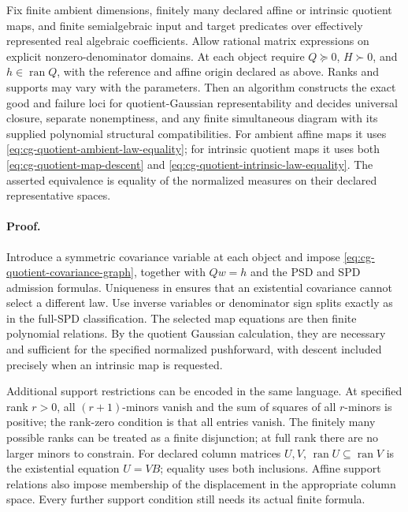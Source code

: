 Fix finite ambient dimensions, finitely many declared
affine or intrinsic quotient maps, and finite
semialgebraic input and target predicates over effectively
represented real algebraic coefficients. Allow rational
matrix expressions on explicit nonzero-denominator
domains. At each object require \(Q\succeq0\),
\(H\succ0\), and \(h\in\operatorname{ran}Q\), with the
reference and affine origin declared as above.
Ranks and supports may vary with the parameters.
Then an algorithm constructs the exact good and
failure loci for quotient-Gaussian representability
and decides universal closure, separate nonemptiness,
and any finite simultaneous diagram with its supplied
polynomial structural compatibilities.
For ambient affine maps it uses
\eqref{eq:cg-quotient-ambient-law-equality}; for intrinsic
quotient maps it uses both
\eqref{eq:cg-quotient-map-descent} and
\eqref{eq:cg-quotient-intrinsic-law-equality}.
The asserted equivalence is equality of the normalized
measures on their declared representative spaces.

\paragraph{Proof.}
Introduce a symmetric covariance variable at each object and
impose \eqref{eq:cg-quotient-covariance-graph}, together
with \(Qw=h\) and the PSD and SPD admission formulas.
Uniqueness in
 ensures
that an existential covariance cannot select a
different law. Use inverse variables or denominator
sign splits exactly as in the full-SPD classification.
The selected map equations are then finite polynomial
relations. By the quotient Gaussian calculation, they
are necessary and sufficient for the specified
normalized pushforward, with descent included
precisely when an intrinsic map is requested.

Additional support restrictions can be encoded in
the same language. At specified rank \(r>0\), all
\((r+1)\)-minors vanish and the sum of squares of all
\(r\)-minors is positive; the rank-zero condition is
that all entries vanish. The finitely many possible
ranks can be treated as a finite disjunction; at
full rank there are no larger minors to constrain.
For declared column matrices \(U,V\),
\(\operatorname{ran}U\subseteq\operatorname{ran}V\)
is the existential equation \(U=VB\); equality uses
both inclusions. Affine support relations also
impose membership of the displacement in the
appropriate column space. Every further support
condition still needs its actual finite formula.

